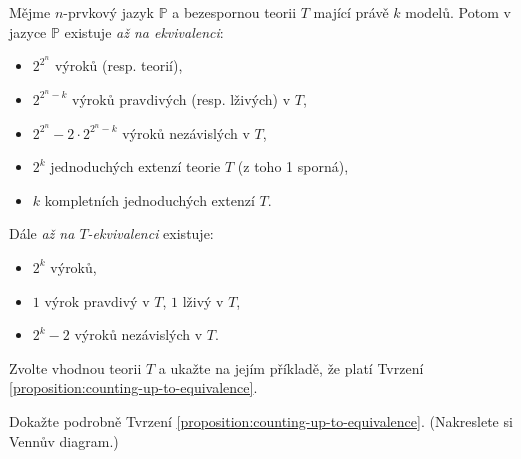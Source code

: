 \begin{proposition}\label{proposition:counting-up-to-equivalence}
Mějme $n$-prvkový jazyk $\mathbb P$ a bezespornou teorii $T$ mající právě $k$ modelů. Potom v jazyce $\mathbb P$ existuje \emph{až na ekvivalenci}:
\begin{itemize}
    \item $2^{2^n}$ výroků (resp. teorií),
    \item $2^{2^n-k}$ výroků pravdivých (resp. lživých) v $T$,
    \item $2^{2^n}-2\cdot 2^{2^n-k}$ výroků nezávislých v $T$,
    \item $2^k$ jednoduchých extenzí teorie $T$ (z toho 1 sporná),
    \item $k$ kompletních jednoduchých extenzí $T$.
\end{itemize}
Dále \emph{až na $T$-ekvivalenci} existuje:
\begin{itemize}
    \item $2^k$ výroků,
    \item $1$ výrok pravdivý v $T$, $1$ lživý v $T$,
    \item $2^k-2$ výroků nezávislých v $T$.
\end{itemize}
\end{proposition}

\begin{exercise}
    Zvolte vhodnou teorii $T$ a ukažte na jejím příkladě, že platí Tvrzení \ref{proposition:counting-up-to-equivalence}.
\end{exercise}

\begin{exercise}
    Dokažte podrobně Tvrzení \ref{proposition:counting-up-to-equivalence}. (Nakreslete si Vennův diagram.)
\end{exercise}